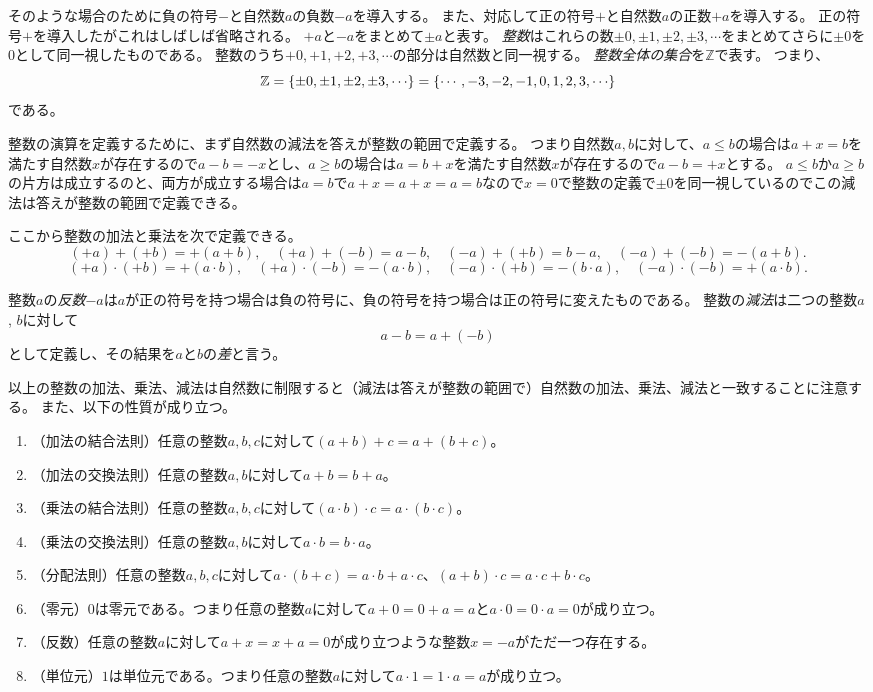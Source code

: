 そのような場合のために負の符号$-$と自然数$a$の負数$-a$を導入する。
また、対応して正の符号$+$と自然数$a$の正数$+a$を導入する。
正の符号$+$を導入したがこれはしばしば省略される。
$+a$と$-a$をまとめて$\pm a$と表す。
\emph{整数}はこれらの数$\pm 0, \pm 1, \pm 2, \pm 3, \cdots$をまとめてさらに$\pm 0$を$0$として同一視したものである。
整数のうち$+0, +1, +2, +3, \cdots$の部分は自然数と同一視する。
\emph{整数全体の集合}を$\mathbb{Z}$で表す。
つまり、
$$
\mathbb{Z} = \lrset{ \pm 0, \pm 1, \pm 2, \pm 3, \cdots } = \lrset{ \cdots, -3, -2, -1, 0, 1, 2, 3, \cdots }
$$
である。

整数の演算を定義するために、まず自然数の減法を答えが整数の範囲で定義する。
つまり自然数$a, b$に対して、$a \le b$の場合は$a+x = b$を満たす自然数$x$が存在するので$a-b = -x$とし、$a \ge b$の場合は$a = b+x$を満たす自然数$x$が存在するので$a-b = +x$とする。
$a \le b$か$a \ge b$の片方は成立するのと、両方が成立する場合は$a = b$で$a+x = a+x = a = b$なので$x = 0$で整数の定義で$\pm 0$を同一視しているのでこの減法は答えが整数の範囲で定義できる。

ここから整数の加法と乗法を次で定義できる。
$$
(+a)+(+b) = +(a+b),
\quad (+a)+(-b) = a-b,
\quad (-a)+(+b) = b-a,
\quad (-a)+(-b) = -(a+b).
$$
$$
(+a)\cdot (+b) = +(a\cdot b),
\quad (+a)\cdot (-b) = -(a\cdot b),
\quad (-a)\cdot (+b) = -(b\cdot a),
\quad (-a)\cdot (-b) = +(a\cdot b).
$$

整数$a$の\emph{反数}$-a$は$a$が正の符号を持つ場合は負の符号に、負の符号を持つ場合は正の符号に変えたものである。
整数の\emph{減法}は二つの整数$a$, $b$に対して
$$
a-b = a+(-b)
$$
として定義し、その結果を$a$と$b$の\emph{差}と言う。

以上の整数の加法、乗法、減法は自然数に制限すると（減法は答えが整数の範囲で）自然数の加法、乗法、減法と一致することに注意する。
また、以下の性質が成り立つ。
\begin{enumerate}
\item
（加法の結合法則）任意の整数$a, b, c$に対して$(a+b)+c = a+(b+c)$。
\item
（加法の交換法則）任意の整数$a, b$に対して$a+b = b+a$。
\item
（乗法の結合法則）任意の整数$a, b, c$に対して$(a\cdot b)\cdot c = a\cdot (b\cdot c)$。
\item
（乗法の交換法則）任意の整数$a, b$に対して$a\cdot b = b\cdot a$。
\item
（分配法則）任意の整数$a, b, c$に対して$a\cdot (b+c) = a\cdot b+a\cdot c$、$(a+b)\cdot c = a\cdot c+b\cdot c$。
\item
（零元）$0$は零元である。つまり任意の整数$a$に対して$a+0 = 0+a = a$と$a\cdot 0 = 0\cdot a = 0$が成り立つ。
\item
（反数）任意の整数$a$に対して$a+x = x+a = 0$が成り立つような整数$x = -a$がただ一つ存在する。
\item
（単位元）$1$は単位元である。つまり任意の整数$a$に対して$a\cdot 1 = 1\cdot a = a$が成り立つ。
\end{enumerate}

